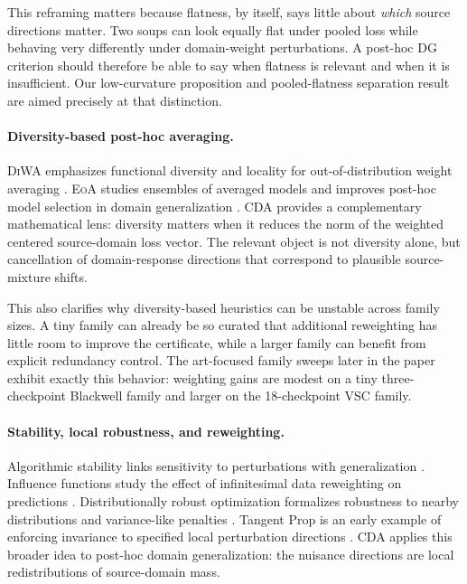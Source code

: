 \documentclass{article}
\theoremstyle{definition}
\newcommand{\diwa}{\textup{\textsc{DiWA}}}
\newcommand{\eoa}{\textup{\textsc{EoA}}}
\begin{document}
This reframing matters because flatness, by itself, says little about \emph{which} source directions matter. Two soups can look equally flat under pooled loss while behaving very differently under domain-weight perturbations. A post-hoc DG criterion should therefore be able to say when flatness is relevant and when it is insufficient. Our low-curvature proposition and pooled-flatness separation result are aimed precisely at that distinction.

\paragraph{Diversity-based post-hoc averaging.}
\diwa{} emphasizes functional diversity and locality for out-of-distribution weight averaging \citep{rame2022diwa}. \eoa{} studies ensembles of averaged models and improves post-hoc model selection in domain generalization \citep{arpit2022eoa}. CDA provides a complementary mathematical lens: diversity matters when it reduces the norm of the weighted centered source-domain loss vector. The relevant object is not diversity alone, but cancellation of domain-response directions that correspond to plausible source-mixture shifts.

This also clarifies why diversity-based heuristics can be unstable across family sizes. A tiny family can already be so curated that additional reweighting has little room to improve the certificate, while a larger family can benefit from explicit redundancy control. The art-focused family sweeps later in the paper exhibit exactly this behavior: weighting gains are modest on a tiny three-checkpoint Blackwell family and larger on the 18-checkpoint VSC family.

\paragraph{Stability, local robustness, and reweighting.}
Algorithmic stability links sensitivity to perturbations with generalization \citep{bousquet2002stability,hardt2016sgd}. Influence functions study the effect of infinitesimal data reweighting on predictions \citep{koh2017influence}. Distributionally robust optimization formalizes robustness to nearby distributions and variance-like penalties \citep{duchi2020variance,duchi2021dro}. Tangent Prop is an early example of enforcing invariance to specified local perturbation directions \citep{simard1992tangent}. CDA applies this broader idea to post-hoc domain generalization: the nuisance directions are local redistributions of source-domain mass.
\end{document}
